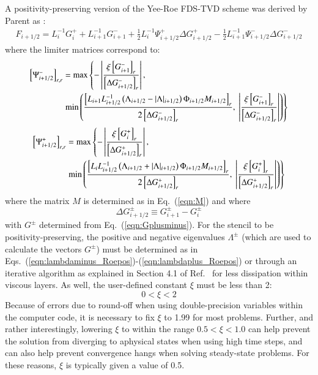 \documentclass{warpdoc}
\newcommand{\alb}{\vspace{0.2cm}\\} %
\newcommand{\mfd}{\displaystyle}
\begin{document}
A positivity-preserving version of the Yee-Roe FDS-TVD scheme was derived by Parent as \cite{jcp:2013:parent:2}:
%
\begin{equation}
\begin{array}{l}\mfd
F_{i+1/2}=L^{-1}_{i} G_{i}^+  
        + L^{-1}_{i+1} G_{i+1}^-  
        + \frac{1}{2}L^{-1}_{i}  \Psi_{i+1/2}^+ \Delta G_{i+1/2}^+ 
        - \frac{1}{2} L^{-1}_{i+1} \Psi_{i+1/2}^- \Delta G_{i+1/2}^- 
\end{array}
\label{eqn:FDS_2o_TVD_pos}
\end{equation}
%
where the limiter matrices correspond to:
%
\begin{align}
   \left[\Psi_{i+1/2}^-\right]_{r,r}  
&=
{\rm max}\left\{ -\left|\frac{\xi\left[ G_{i+1}^-\right]_r}{\left[\Delta G_{i+1/2}^-\right]_r} \right|, \right.\nonumber\alb
&\left.{\rm min}\left(
\frac{\left[L_{i+1} L^{-1}_{i+1/2} \left( \Lambda_{i+1/2} - |\Lambda|_{i+1/2}  \right) \Phi_{i+1/2} M_{i+1/2} \right]_r}{2 \left[\Delta G_{i+1/2}^- \right]_r}
,~\left|\frac{\xi\left[ G_{i+1}^-\right]_r}{\left[\Delta G_{i+1/2}^-\right]_r} \right|
\right)\right\}
\end{align}
%
%
\begin{align}
   \left[\Psi_{i+1/2}^+\right]_{r,r}  
&=
{\rm max}\left\{ -\left|\frac{\xi\left[ G_{i}^+\right]_r}{\left[\Delta G_{i+1/2}^+\right]_r} \right|,\right.\nonumber\alb
&\left.{\rm min}\left(
\frac{\left[L_{i} L^{-1}_{i+1/2} \left( \Lambda_{i+1/2} + |\Lambda|_{i+1/2}  \right) \Phi_{i+1/2} M_{i+1/2}  \right]_r}{2 \left[\Delta G_{i+1/2}^+ \right]_r}
,~\left|\frac{\xi\left[ G_{i}^+\right]_r}{\left[\Delta G_{i+1/2}^+\right]_r} \right|
\right)\right\}
\end{align}
%
where the matrix $M$ is determined as in Eq.\ (\ref{eqn:M}) and where 
%
\begin{equation}
\Delta G_{i+1/2}^\pm \equiv G_{i+1}^\pm - G_i^\pm
\end{equation}
%
with $G^\pm$ determined from Eq.\ (\ref{eqn:Gplusminus}). For the stencil to be positivity-preserving, the positive and negative eigenvalues $\Lambda^\pm$ (which are used to calculate the vectors $G^\pm$) must be determined as in Eqs.\ (\ref{eqn:lambdaminus_Roepos})-(\ref{eqn:lambdaplus_Roepos}) or through an iterative algorithm as explained in Section 4.1 of Ref.\ \cite{jcp:2013:parent:2} for less dissipation within viscous layers.   As well, the user-defined constant $\xi$ must be less than 2:
%
\begin{equation}
0< \xi<2
\end{equation}
%
Because of errors due to round-off when using double-precision variables within the computer code, it is necessary to fix $\xi$ to 1.99 for most problems. Further, and rather interestingly, lowering $\xi$ to within the range $0.5<\xi<1.0$ can help prevent the solution from diverging to aphysical states when using high time steps, and can also help prevent convergence hangs when solving steady-state problems. For these reasons, $\xi$ is typically given a value of 0.5.
\end{document}
